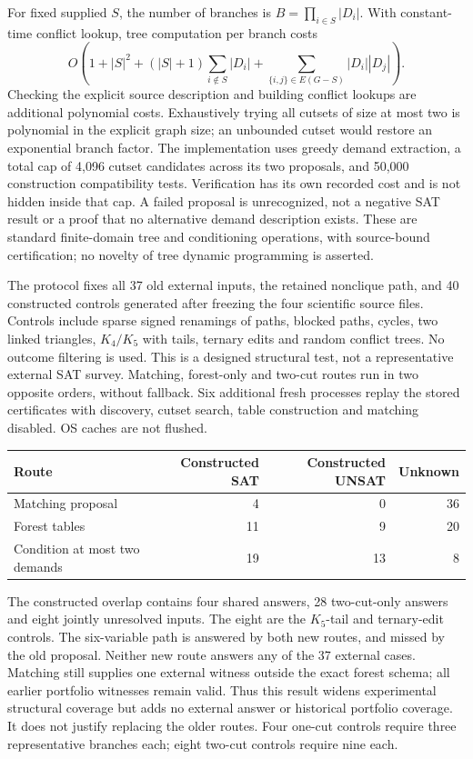 For fixed supplied $S$, the number of branches is
$B=\prod_{i\in S}|D_i|$. With constant-time conflict lookup, tree computation per
branch costs
\[
 O\!\left(1+|S|^2+(|S|+1)\sum_{i\notin S}|D_i|
       +\sum_{\{i,j\}\in E(G-S)}|D_i||D_j|\right).
\]
Checking the explicit source description and building conflict lookups are
additional polynomial costs. Exhaustively trying all cutsets of size at most
two is polynomial in the explicit graph size; an unbounded cutset would restore
an exponential branch factor. The implementation uses greedy demand extraction,
a total cap of 4,096 cutset candidates across its two proposals, and 50,000
construction compatibility tests. Verification has its own recorded cost and is
not hidden inside that cap. A failed proposal is unrecognized, not a negative
SAT result or a proof that no alternative demand description exists. These are
standard finite-domain tree and conditioning operations, with source-bound
certification; no novelty of tree dynamic programming is asserted.

The protocol fixes all 37 old external inputs, the retained nonclique path, and
40 constructed controls generated after freezing the four scientific source
files. Controls include sparse signed renamings of paths, blocked paths, cycles,
two linked triangles, $K_4/K_5$ with tails, ternary edits and random conflict trees.
No outcome filtering is used. This is a designed structural test, not a
representative external SAT survey. Matching, forest-only and two-cut routes run
in two opposite orders, without fallback. Six additional fresh processes replay
the stored certificates with discovery, cutset search, table construction and
matching disabled. OS caches are not flushed.

\begin{center}
\begin{tabular}{lrrr}
\toprule
Route & Constructed SAT & Constructed UNSAT & Unknown \\
\midrule
Matching proposal & 4 & 0 & 36 \\
Forest tables & 11 & 9 & 20 \\
Condition at most two demands & 19 & 13 & 8 \\
\bottomrule
\end{tabular}
\end{center}

The constructed overlap contains four shared answers, 28 two-cut-only answers
and eight jointly unresolved inputs. The eight are the $K_5$-tail and ternary-edit
controls. The six-variable path is answered by both new routes, and missed by the
old proposal. Neither new route answers any of the 37 external cases. Matching
still supplies one external witness outside the exact forest schema; all earlier
portfolio witnesses remain valid. Thus this result widens experimental structural
coverage but adds no external answer or historical portfolio coverage. It does
not justify replacing the older routes. Four one-cut controls require three
representative branches each; eight two-cut controls require nine each.

